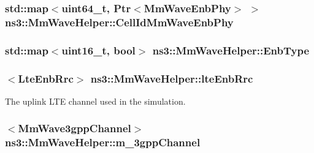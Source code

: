 \subsubsection[{\texorpdfstring{Cell\+Id\+Mm\+Wave\+Enb\+Phy}{CellIdMmWaveEnbPhy}}]{\setlength{\rightskip}{0pt plus 5cm}std\+::map$<$uint64\+\_\+t, {\bf Ptr}$<${\bf Mm\+Wave\+Enb\+Phy}$>$ $>$ ns3\+::\+Mm\+Wave\+Helper\+::\+Cell\+Id\+Mm\+Wave\+Enb\+Phy\hspace{0.3cm}{\ttfamily [private]}}\hypertarget{classns3_1_1MmWaveHelper_af1bd1010ff8be40be5e86c076acf116d}{}\label{classns3_1_1MmWaveHelper_af1bd1010ff8be40be5e86c076acf116d}
\subsubsection[{\texorpdfstring{Enb\+Type}{EnbType}}]{\setlength{\rightskip}{0pt plus 5cm}std\+::map$<$uint16\+\_\+t, bool$>$ ns3\+::\+Mm\+Wave\+Helper\+::\+Enb\+Type\hspace{0.3cm}{\ttfamily [private]}}\hypertarget{classns3_1_1MmWaveHelper_a5da34e3048341219417e4e2c154527e5}{}\label{classns3_1_1MmWaveHelper_a5da34e3048341219417e4e2c154527e5}
\subsubsection[{\texorpdfstring{lte\+Enb\+Rrc}{lteEnbRrc}}]{$<${\bf Lte\+Enb\+Rrc}$>$ ns3\+::\+Mm\+Wave\+Helper\+::lte\+Enb\+Rrc\hspace{0.3cm}{\ttfamily [private]}}\hypertarget{classns3_1_1MmWaveHelper_a877dec693e5e6669a413ef40e6f7f873}{}\label{classns3_1_1MmWaveHelper_a877dec693e5e6669a413ef40e6f7f873}


The uplink L\+TE channel used in the simulation. 

\subsubsection[{\texorpdfstring{m\+\_\+3gpp\+Channel}{m_3gppChannel}}]{$<${\bf Mm\+Wave3gpp\+Channel}$>$ ns3\+::\+Mm\+Wave\+Helper\+::m\+\_\+3gpp\+Channel\hspace{0.3cm}{\ttfamily [private]}}\hypertarget{classns3_1_1MmWaveHelper_a1cbb083568aa048da48260725e3cf4a4}{}\label{classns3_1_1MmWaveHelper_a1cbb083568aa048da48260725e3cf4a4}

